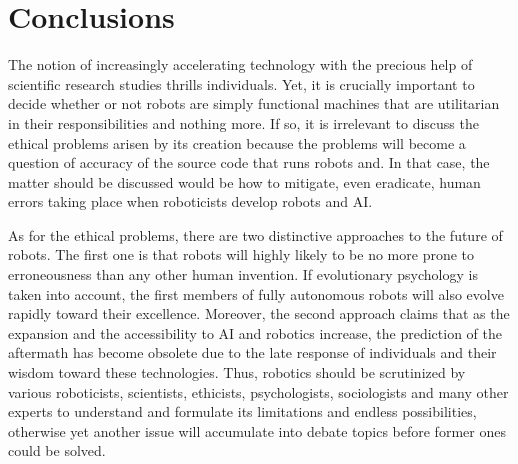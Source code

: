 \documentclass[man]{apa6}
\begin{document}
\section{Conclusions}
The notion of increasingly accelerating technology with the precious help of scientific research studies thrills individuals.
Yet, it is crucially important to decide whether or not robots are simply functional machines that are utilitarian in their responsibilities and nothing more.
If so, it is irrelevant to discuss the ethical problems arisen by its creation because the problems will become a question of accuracy of the source code that runs robots and.
In that case, the matter should be discussed would be how to mitigate, even eradicate, human errors taking place when roboticists develop robots and AI. \par
As for the ethical problems, there are two distinctive approaches to the future of robots. The first one is that robots will highly likely to be no more prone to erroneousness than any other human invention.
If evolutionary psychology is taken into account, the first members of fully autonomous robots will also evolve rapidly toward their excellence.
Moreover, the second approach claims that as the expansion and the accessibility to AI and robotics increase, the prediction of the aftermath has become obsolete due to the late response of individuals and their wisdom toward these technologies.
Thus, robotics should be scrutinized by various roboticists, scientists, ethicists, psychologists, sociologists and many other experts to understand and formulate its limitations and endless possibilities, otherwise yet another issue will accumulate into debate topics before former ones could be solved. 



\end{document}
